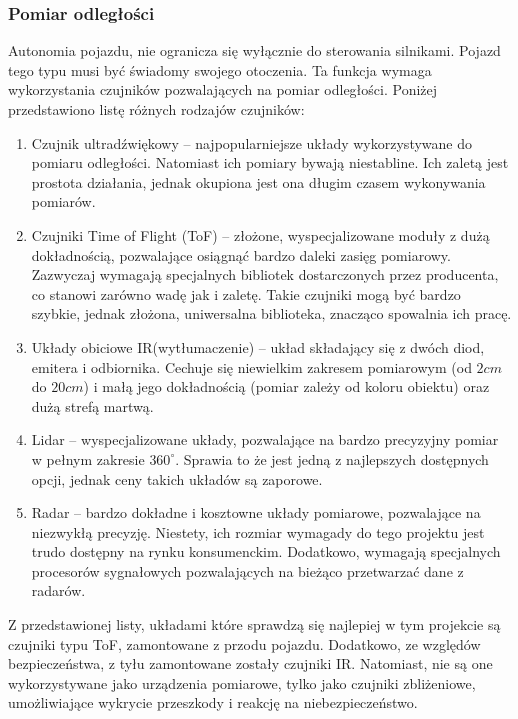         \subsubsection{Pomiar odległości}
            Autonomia pojazdu, nie ogranicza się wyłącznie do sterowania silnikami.
            Pojazd tego typu musi być świadomy swojego otoczenia. Ta funkcja wymaga wykorzystania czujników pozwalających na pomiar odległości.
            Poniżej przedstawiono listę różnych rodzajów czujników:
            \begin{enumerate}
                \item Czujnik ultradźwiękowy -- najpopularniejsze układy wykorzystywane do pomiaru odległości.
                Natomiast ich pomiary bywają niestabline. Ich zaletą jest prostota działania, jednak okupiona jest ona długim czasem wykonywania pomiarów.
                \item Czujniki Time of Flight (ToF) -- złożone, wyspecjalizowane moduły z dużą dokładnością, pozwalające osiągnąć bardzo daleki zasięg pomiarowy.
                Zazwyczaj wymagają specjalnych bibliotek dostarczonych przez producenta, co stanowi zarówno wadę jak i zaletę. Takie czujniki mogą być bardzo szybkie, jednak złożona, uniwersalna biblioteka, znacząco spowalnia ich pracę.
                \item Układy obiciowe IR(wytłumaczenie) -- układ składający się z dwóch diod, emitera i odbiornika. Cechuje się niewielkim zakresem pomiarowym (od $2cm$ do $20cm$) i małą jego dokładnością (pomiar zależy od koloru obiektu) oraz dużą strefą martwą.
                \item Lidar -- wyspecjalizowane układy, pozwalające na bardzo precyzyjny pomiar w pełnym zakresie $360^\circ$.
                Sprawia to że jest jedną z najlepszych dostępnych opcji, jednak ceny takich układów są zaporowe.
                \item Radar -- bardzo dokładne i kosztowne układy pomiarowe, pozwalające na niezwykłą precyzję. Niestety, ich rozmiar wymagady do tego projektu jest trudo dostępny na rynku konsumenckim. Dodatkowo, wymagają specjalnych procesorów sygnałowych pozwalających na bieżąco przetwarzać dane z radarów.
            \end{enumerate}
            Z przedstawionej listy, układami które sprawdzą się najlepiej w tym projekcie są czujniki typu ToF, zamontowane z przodu pojazdu.
            Dodatkowo, ze względów bezpieczeństwa, z tyłu zamontowane zostały czujniki IR. Natomiast, nie są one wykorzystywane jako urządzenia pomiarowe,
            tylko jako czujniki zbliżeniowe, umożliwiające wykrycie przeszkody i reakcję na niebezpieczeństwo.

